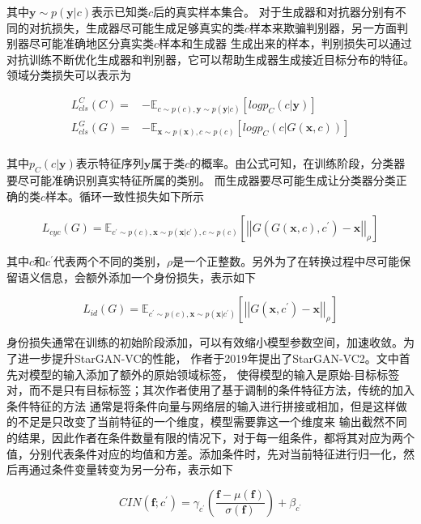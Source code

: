 其中$\mathbf{y}\sim p(\mathbf{y}|c)$表示已知类$c$后的真实样本集合。
对于生成器和对抗器分别有不同的对抗损失，生成器尽可能生成足够真实的类$c$样本来欺骗判别器，另一方面判别器尽可能准确地区分真实类$c$样本和生成器
生成出来的样本，判别损失可以通过对抗训练不断优化生成器和判别器，它可以帮助生成器生成接近目标分布的特征。
领域分类损失可以表示为

\begin{align}
    L^C_{cls}(C) = & -\mathbb{E}_{c\sim p(c),\mathbf{y}\sim p(\mathbf{y}|c)}\left[ log p_C(c|\mathbf{y}) \right] \\
    L^G_{cls}(G) = & -\mathbb{E}_{\mathbf{x}\sim p(\mathbf{x}),c\sim p(c)}\left[ log p_C(c|G(\mathbf{x},c)) \right] \\
\end{align}

其中$p_C(c|\mathbf{y})$表示特征序列$\mathbf{y}$属于类$c$的概率。由公式可知，在训练阶段，分类器要尽可能准确识别真实特征所属的类别。
而生成器要尽可能生成让分类器分类正确的类$c$样本。循环一致性损失如下所示

\begin{equation}
    L_{cyc}(G) = \mathbb{E}_{c^{'}\sim p(c),\mathbf{x}\sim p(\mathbf{x}|c^{'}),c\sim p(c)}\left[ \left| \left| G(G(\mathbf{x},c),c^{'})-\mathbf{x} \right| \right|_{\rho} \right]
\end{equation}

其中$c$和$c^{'}$代表两个不同的类别，$\rho$是一个正整数。另外为了在转换过程中尽可能保留语义信息，会额外添加一个身份损失，表示如下

\begin{equation}
    L_{id}(G) = \mathbb{E}_{c^{'}\sim p(c),\mathbf{x}\sim p(\mathbf{x}|c^{'})}\left[\left| \left| G(\mathbf{x},c^{'})-\mathbf{x} \right| \right|_{\rho} \right]
\end{equation}

身份损失通常在训练的初始阶段添加，可以有效缩小模型参数空间，加速收敛。为了进一步提升StarGAN-VC的性能，
作者于2019年提出了StarGAN-VC2\cite{kaneko2019stargan}。文中首先对模型的输入添加了额外的原始领域标签，
使得模型的输入是原始-目标标签对，而不是只有目标标签；其次作者使用了基于调制的条件特征方法，传统的加入条件特征的方法
通常是将条件向量与网络层的输入进行拼接或相加，但是这样做的不足是只改变了当前特征的一个维度，模型需要靠这一个维度来
输出截然不同的结果，因此作者在条件数量有限的情况下，对于每一组条件，都将其对应为两个
值，分别代表条件对应的均值和方差。添加条件时，先对当前特征进行归一化，然后再通过条件变量转变为另一分布，表示如下

\begin{equation}
    CIN(\mathbf{f};c^{'})=\gamma_{c^{'}}(\frac{\mathbf{f}-\mu(\mathbf{f})}{\sigma(\mathbf{f})})+\beta_{c^{'}}
\end{equation}

